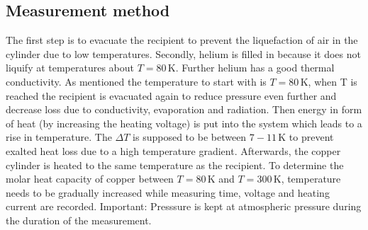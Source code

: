 \subsection{Measurement method}
The first step is to evacuate the recipient to prevent the liquefaction of air in the cylinder due to low temperatures.
Secondly, helium is filled in because it does not liquify at temperatures about $T=80\, \unit{\kelvin}$. Further helium has a good thermal conductivity.
As mentioned the temperature to start with is $T=80\, \unit{\kelvin}$, when T is reached the recipient is evacuated again to reduce pressure even further and decrease loss due to conductivity, evaporation and radiation.
Then energy in form of heat (by increasing the heating voltage) is put into the system which leads to a rise in temperature.  
The $\Delta T$ is supposed to be between $7-11\,\unit{\kelvin} $ to prevent exalted heat loss due to a high temperature gradient.
Afterwards, the copper cylinder is heated to the same temperature as the recipient.
To determine the molar heat capacity of copper between  $T=80\, \unit{\kelvin}$ and $T=300\, \unit{\kelvin}$, temperature needs to be gradually increased while measuring time, voltage and heating current are recorded.
Important: Presssure is kept at atmospheric pressure during the duration of the measurement.